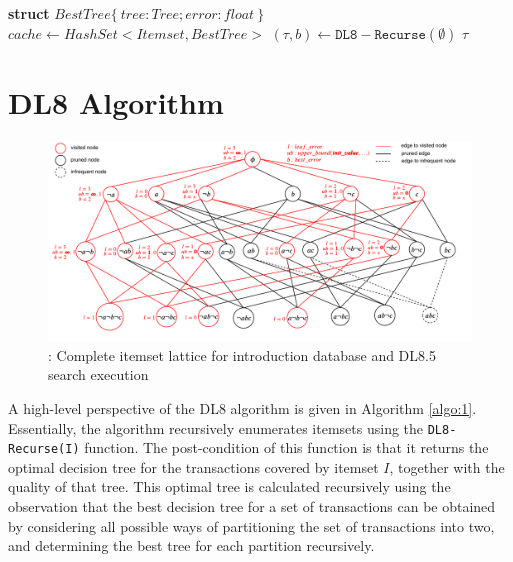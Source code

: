 \begin{algorithm}[!ht]\small
	\DontPrintSemicolon
	\caption{$DL8(maxdepth, minsup)$}
	\label{algo:1}
	\textbf{struct} $BestTree\{\ tree : Tree; error : float\ \}$\;
	$cache \gets HashSet < Itemset, BestTree >$\;
	$(\tau, b) \gets \mathrm{\mathtt{DL8-Recurse}}(\emptyset)$\;
	\Return $\tau$\;
\end{algorithm}

\section{DL8 Algorithm}
\begin{figure}
	\centering
	\includegraphics[width=0.98\linewidth]{images/lattice_search}
	\caption{: Complete itemset lattice for introduction database and DL8.5 search execution}
	\label{fig:2}
\end{figure}

A high-level perspective of the DL8 algorithm is given in Algorithm \ref{algo:1}. Essentially, the algorithm recursively enumerates itemsets using the \verb|DL8-Recurse(I)| function. The post-condition of this function is that it returns the optimal decision tree for the transactions covered by itemset $I$, together with the quality of that tree. This optimal tree is calculated recursively using the observation that the best decision tree for a set of transactions can be obtained by considering all possible ways of partitioning the set of transactions into two, and determining the best tree for each partition recursively.

